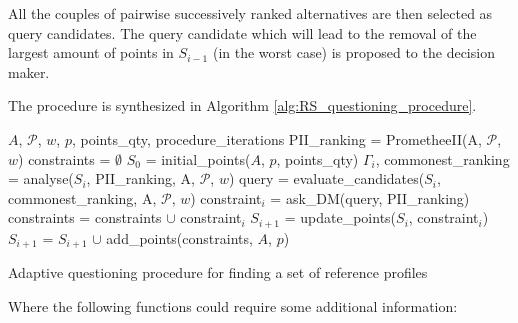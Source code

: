 All the couples of pairwise successively ranked alternatives are then selected as query candidates.
The query candidate which will lead to the removal of the largest amount of points in $S_{i-1}$ (in the worst case) is proposed to the decision maker.

The procedure is synthesized in Algorithm \ref{alg:RS_questioning_procedure}.

\begin{algorithm}[H]
\begin{algorithmic}[1]
    \REQUIRE $A$, $\mathcal{P}$, $w$, $p$, points\_qty, procedure\_iterations
    \STATE PII\_ranking = PrometheeII(A, $\mathcal{P}$, $w$)
    \STATE constraints = $\emptyset$
    \STATE $S_0$ = initial\_points($A$, $p$, points\_qty)
        \STATE $\Gamma_i$, commonest\_ranking = analyse($S_{i}$, PII\_ranking, A, $\mathcal{P}$, $w$)
        \STATE query = evaluate\_candidates($S_i$, commonest\_ranking, A, $\mathcal{P}$, $w$)
        \STATE constraint$_i$ = ask\_DM(query, PII\_ranking)
        \STATE constraints = constraints $\cup$ constraint$_i$
        \STATE $S_{i+1}$ = update\_points($S_i$, constraint$_i$)
            \STATE $S_{i+1}$ = $S_{i+1}$ $ \cup $ add\_points(constraints, $A$, $p$)
        \ENDIF
    \ENDFOR
\end{algorithmic}
\caption{Adaptive questioning procedure for finding a set of reference profiles}
\label{alg:RS_questioning_procedure}
\end{algorithm}

Where the following functions could require some additional information:

